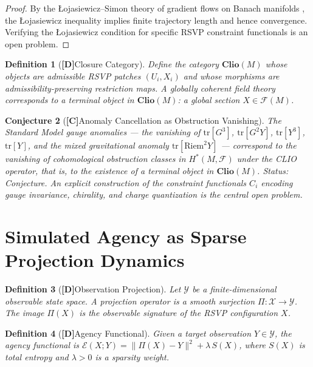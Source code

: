 \documentclass[12pt,a4paper]{article}
\newcommand{\claimD}{\textbf{[D]}\;}
\newcommand{\claimC}{\textbf{[C]}\;}
\newtheorem{defn}{Definition}[section]
\newtheorem{appconj}[defn]{Conjecture}
\begin{document}
\begin{proof}
By the Łojasiewicz--Simon theory of gradient flows on Banach manifolds
\cite{Lojasiewicz1963,Simon1983}, the Łojasiewicz inequality implies finite
trajectory length and hence convergence. Verifying the Łojasiewicz condition
for specific RSVP constraint functionals is an open problem.
\end{proof}

\begin{defn}[\claimD Closure Category]
Define the category $\mathbf{Clio}(M)$ whose objects are admissible RSVP
patches $(U_i, X_i)$ and whose morphisms are admissibility-preserving
restriction maps. A globally coherent field theory corresponds to a terminal
object in $\mathbf{Clio}(M)$: a global section $X\in\mathcal{F}(M)$.
\end{defn}

\begin{appconj}[\claimC Anomaly Cancellation as Obstruction Vanishing]
The Standard Model gauge anomalies --- the vanishing of $\mathrm{tr}[G^3]$,
$\mathrm{tr}[G^2 Y]$, $\mathrm{tr}[Y^3]$, $\mathrm{tr}[Y]$, and the mixed
gravitational anomaly $\mathrm{tr}[\mathrm{Riem}^2 Y]$ --- correspond to the
vanishing of cohomological obstruction classes in $H^\ast(M, \mathcal{F})$
under the CLIO operator, that is, to the existence of a terminal object in
$\mathbf{Clio}(M)$.
\emph{Status: Conjecture.} An explicit construction of the constraint
functionals $C_i$ encoding gauge invariance, chirality, and charge quantization
is the central open problem.
\end{appconj}

\section{Simulated Agency as Sparse Projection Dynamics}

\begin{defn}[\claimD Observation Projection]
Let $\mathcal{Y}$ be a finite-dimensional observable state space. A
\emph{projection operator} is a smooth surjection
$\Pi: \mathcal{X}\to\mathcal{Y}$.
The image $\Pi(X)$ is the observable signature of the RSVP configuration $X$.
\end{defn}

\begin{defn}[\claimD Agency Functional]
Given a target observation $Y\in\mathcal{Y}$, the agency functional is
$\mathcal{E}(X;Y) = \|\Pi(X) - Y\|^2 + \lambda\,S(X)$,
where $S(X)$ is total entropy and $\lambda > 0$ is a sparsity weight.
\end{defn}
\end{document}
